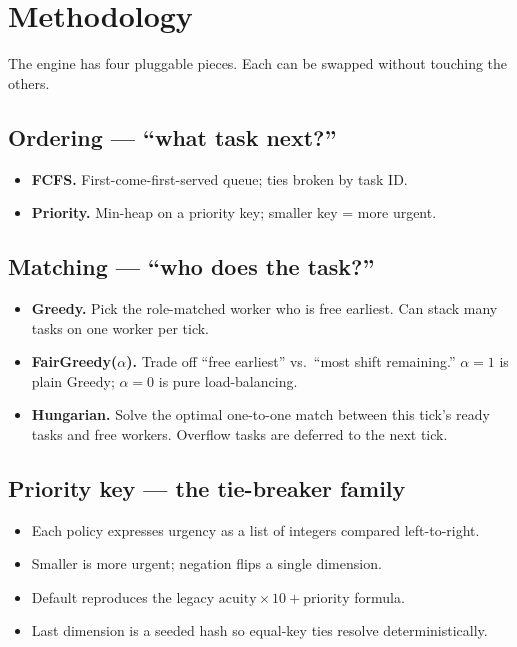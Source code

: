 \section{Methodology}
\label{sec:methodology}

\noindent
The engine has four pluggable pieces. Each can be swapped without
touching the others.

\subsection{Ordering --- ``what task next?''}

\begin{itemize}
  \item \textbf{FCFS.}\; First-come-first-served queue;
        ties broken by task ID.
  \item \textbf{Priority.}\; Min-heap on a priority key;
        smaller key = more urgent.
\end{itemize}

\subsection{Matching --- ``who does the task?''}

\begin{itemize}
  \item \textbf{Greedy.}\; Pick the role-matched worker who is
        free earliest. Can stack many tasks on one worker per
        tick.
  \item \textbf{FairGreedy($\alpha$).}\;
        Trade off ``free earliest'' vs.\ ``most shift remaining.''
        $\alpha\!=\!1$ is plain Greedy; $\alpha\!=\!0$ is pure
        load-balancing.
  \item \textbf{Hungarian.}\; Solve the optimal one-to-one match
        between this tick's ready tasks and free workers.
        Overflow tasks are deferred to the next tick.
\end{itemize}

\subsection{Priority key --- the tie-breaker family}

\begin{itemize}
  \item Each policy expresses urgency as a list of integers
        compared left-to-right.
  \item Smaller is more urgent; negation flips a single dimension.
  \item Default reproduces the legacy
        $\text{acuity}\!\times\!10 + \text{priority}$ formula.
  \item Last dimension is a seeded hash so equal-key ties resolve
        deterministically.
\end{itemize}

